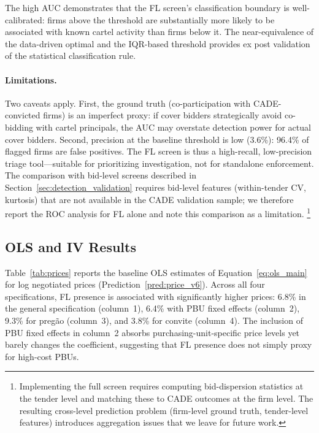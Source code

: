 

The high AUC demonstrates that the FL screen's classification boundary
is well-calibrated: firms above the threshold are substantially more
likely to be associated with known cartel activity than firms below it.
The near-equivalence of the data-driven optimal and the IQR-based
threshold provides ex post validation of the statistical classification
rule.

\paragraph{Limitations.} %
Two caveats apply. First, the ground truth (co-participation with
CADE-convicted firms) is an imperfect proxy: if cover bidders
strategically avoid co-bidding with cartel principals, the AUC may
overstate detection power for actual cover bidders. Second, precision
at the baseline threshold is low (3.6\%): 96.4\% of flagged firms are
false positives. The FL screen is thus a high-recall, low-precision
triage tool---suitable for prioritizing investigation, not for
standalone enforcement. The comparison with \citet{imhof2019detecting}
bid-level screens described in Section~\ref{sec:detection_validation}
requires bid-level features (within-tender CV, kurtosis) that are not
available in the CADE validation sample; we therefore report the ROC
analysis for FL alone and note this comparison as a limitation.%
\footnote{Implementing the full \citet{imhof2019detecting} screen
requires computing bid-dispersion statistics at the tender level and
matching these to CADE outcomes at the firm level. The resulting
cross-level prediction problem (firm-level ground truth, tender-level
features) introduces aggregation issues that we leave for future work.}


\subsection{OLS and IV Results}
\label{sec:results_ols}

Table~\ref{tab:prices} reports the baseline OLS estimates of
Equation~\eqref{eq:ols_main} for log negotiated prices
(Prediction~\ref{pred:price_v6}). Across all four
specifications, FL presence is associated with significantly higher
prices: 6.8\% in the general specification (column~1), 6.4\% with PBU
fixed effects (column~2), 9.3\% for preg\~ao (column~3), and 3.8\% for
convite (column~4). The inclusion of PBU fixed effects in column~2
absorbs purchasing-unit-specific price levels yet barely changes the
coefficient, suggesting that FL presence does not simply proxy for
high-cost PBUs.


